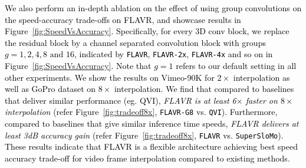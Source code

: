 \documentclass[10pt,twocolumn,letterpaper]{article}
\newcommand{\figref}[1]{Figure~\ref{#1}}
\newcommand{\Ours}{FLAVR}
\newcommand{\twox}{$2\times$}
\newcommand{\eightx}{$8\times$}
\newcommand{\stimes}{{\times}}
\newcommand{\new}[1]{\textcolor{black}{#1}}
\begin{document}
\new{ We also perform an in-depth ablation on the effect of using group convolutions \cite{Tran19} on the speed-accuracy trade-offs on \Ours{}, and showcase results in \figref{fig:SpeedVsAccuracy}. Specifically, for every 3D conv block, we replace the residual block by a channel separated convolution block \cite{Tran19} with groups $g=1,2,4,8 \text{ and } 16$, indicated by \texttt{FLAVR}, \texttt{FLAVR-2x}, \texttt{FLAVR-4x} and so on in \figref{fig:SpeedVsAccuracy}. Note that $g=1$ refers to our default setting in all other experiments. We show the results on Vimeo-90K for \twox{} interpolation as well as GoPro dataset on \eightx{} interpolation. We find that compared to baselines that deliver similar performance (eg. QVI), \emph{\Ours{} is at least 6$\stimes$ faster on \eightx interpolation} (refer \figref{fig:tradeoff8x}, \texttt{FLAVR-G8} vs. \texttt{QVI}). Furthermore, compared to baselines that give similar inference time speeds, \emph{\Ours{} delivers at least 3dB accuracy gain} (refer \figref{fig:tradeoff8x}, \texttt{FLAVR} vs. \texttt{SuperSloMo}). These results indicate that \Ours{} is a flexible architecture achieving best speed accuracy trade-off for video frame interpolation compared to existing methods. }
\end{document}
